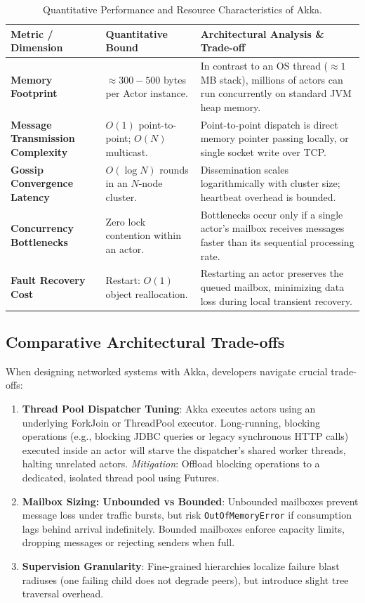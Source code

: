 \begin{table}[htbp]
\centering
\small
\begin{tabularx}{\textwidth}{l p{3.5cm} X}
\toprule
\textbf{Metric / Dimension} & \textbf{Quantitative Bound} & \textbf{Architectural Analysis \& Trade-off} \\
\midrule
\textbf{Memory Footprint} & $\approx 300 - 500$ bytes per Actor instance. & In contrast to an OS thread ($\approx 1$ MB stack), millions of actors can run concurrently on standard JVM heap memory. \\
\midrule
\textbf{Message Transmission Complexity} & $O(1)$ point-to-point; \newline $O(N)$ multicast. & Point-to-point dispatch is direct memory pointer passing locally, or single socket write over TCP. \\
\midrule
\textbf{Gossip Convergence Latency} & $O(\log N)$ rounds in an $N$-node cluster. & Dissemination scales logarithmically with cluster size; heartbeat overhead is bounded. \\
\midrule
\textbf{Concurrency Bottlenecks} & Zero lock contention within an actor. & Bottlenecks occur only if a single actor’s mailbox receives messages faster than its sequential processing rate. \\
\midrule
\textbf{Fault Recovery Cost} & Restart: $O(1)$ object reallocation. & Restarting an actor preserves the queued mailbox, minimizing data loss during local transient recovery. \\
\bottomrule
\end{tabularx}
\caption{Quantitative Performance and Resource Characteristics of Akka.}
\label{tab:system_complexity}
\end{table}

\subsection{Comparative Architectural Trade-offs}
When designing networked systems with Akka, developers navigate crucial trade-offs:
\begin{enumerate}
    \item \textbf{Thread Pool Dispatcher Tuning}: Akka executes actors using an underlying ForkJoin or ThreadPool executor. Long-running, blocking operations (e.g., blocking JDBC queries or legacy synchronous HTTP calls) executed inside an actor will starve the dispatcher's shared worker threads, halting unrelated actors. \textit{Mitigation}: Offload blocking operations to a dedicated, isolated thread pool using Futures.
    \item \textbf{Mailbox Sizing: Unbounded vs Bounded}: Unbounded mailboxes prevent message loss under traffic bursts, but risk \texttt{OutOfMemoryError} if consumption lags behind arrival indefinitely. Bounded mailboxes enforce capacity limits, dropping messages or rejecting senders when full.
    \item \textbf{Supervision Granularity}: Fine-grained hierarchies localize failure blast radiuses (one failing child does not degrade peers), but introduce slight tree traversal overhead.
\end{enumerate}

